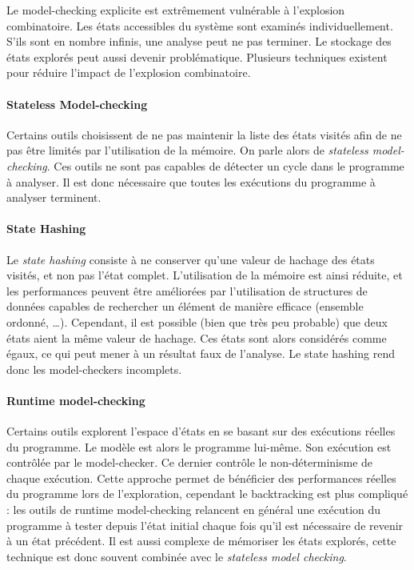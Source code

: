 Le model-checking explicite est extrêmement vulnérable à l'explosion
combinatoire. Les états accessibles du système sont examinés individuellement.
S’ils sont en nombre infinis, une analyse peut ne pas terminer. Le stockage des
états explorés peut aussi devenir problématique. Plusieurs techniques existent
pour réduire l'impact de l'explosion combinatoire.

\paragraph{Stateless Model-checking}
Certains outils choisissent de ne pas maintenir la liste des états
visités afin de ne pas être limités par l'utilisation de la mémoire. On
parle alors de \emph{stateless model-checking}. Ces outils ne sont pas
capables de détecter un cycle dans le programme à analyser. Il est donc
nécessaire que toutes les exécutions du programme à analyser terminent.

\paragraph{State Hashing}
Le \emph{state hashing} consiste à ne conserver qu'une valeur de hachage des
états visités, et non pas l'état complet. L'utilisation de la mémoire est ainsi
réduite, et les performances peuvent être améliorées par l'utilisation de
structures de données capables de rechercher un élément de manière efficace
(ensemble ordonné, \dots). Cependant, il est possible (bien que très peu
probable) que deux états aient la même valeur de hachage. Ces états sont alors
considérés comme égaux, ce qui peut mener à un résultat faux de l'analyse.
Le state hashing rend donc les model-checkers incomplets.

\paragraph{Runtime model-checking}
Certains outils explorent l'espace d'états en se basant sur des
exécutions réelles du programme. Le modèle est alors le programme lui-même.
Son exécution est contrôlée par le model-checker. Ce dernier contrôle le
non-déterminisme de chaque exécution. Cette approche permet de
bénéficier des performances réelles du programme lors de l'exploration,
cependant le backtracking est plus compliqué : les outils de runtime
model-checking relancent en général une exécution du programme à tester
depuis l'état initial chaque fois qu'il est nécessaire de revenir à un
état précédent. Il est aussi complexe de mémoriser les états explorés,
cette technique est donc souvent combinée avec le \emph{stateless model
checking}.

